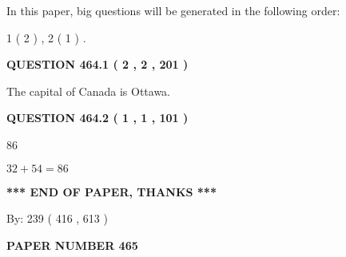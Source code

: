 \documentclass[12pt]{article}
\begin{document}
In this paper, big questions will be generated in the following order: 
   
   
   1 ( 2 )
 ,
   2 ( 1 )
 .
  
\vspace{0.2in}
  
{\textbf{\Large{QUESTION
464.1 
 ( 2 , 2 , 201 )
}}}
  
  
 
 
\noindent{}
 
 
The capital of Canada is Ottawa.
 
 
 
 
  
\vspace{0.2in}
  
{\textbf{\Large{QUESTION
464.2 
 ( 1 , 1 , 101 )
}}}
  
  
 
 
\noindent{}

86
 
 
 
 
\noindent{}

$ %
32 +  %
54=   %
86$
 
 
   
   
 \vspace{0.2in}
 
   
   
   
   
\vspace{1.0in} 
{\textbf{\large{ *** END OF PAPER, THANKS *** }}} 
   
   
\hspace{1.0in} By: 
 239 ( 416 ,  613 )
   
   
   
   
\newpage 
\setcounter{page}{ 
   465001 } 
   
   
   
   
 {\textbf{ \Large{ PAPER NUMBER  465  }}}
   
   
\vspace{0.2in}
   
   
   
   
   
\end{document}
